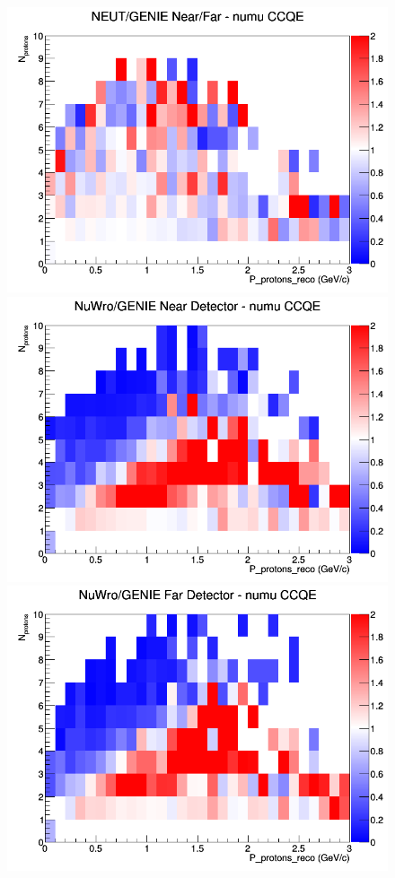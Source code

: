 \begin{figure}[h]
\endminipage
{}
\includegraphics[width=\linewidth]{eff_N_P/LAr/protons/ratios/CCQE_NEUT_GENIE_numu_NF_N_P.png}
\endminipage
\newline
{}
\includegraphics[width=\linewidth]{eff_N_P/LAr/protons/ratios/CCQE_NuWro_GENIE_numu_near_N_P.png}
\endminipage
{}
\includegraphics[width=\linewidth]{eff_N_P/LAr/protons/ratios/CCQE_NuWro_GENIE_numu_far_N_P.png}

\end{figure}
